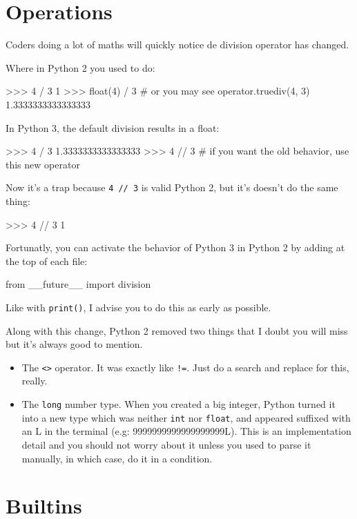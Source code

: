 \section{Operations}

Coders doing a lot of maths will quickly notice de division operator has changed.

Where in Python 2 you used to do:

\begin{py}
>>> 4 / 3
1
>>> float(4) / 3  # or you may see operator.truediv(4, 3)
1.3333333333333333
\end{py}

In Python 3, the default division results in a float:

\begin{py}
>>> 4 / 3
1.3333333333333333
>>> 4 // 3  # if you want the old behavior, use this new operator
\end{py}

Now it's a trap because \lstinline{4 // 3} is valid Python 2, but it's doesn't do the same thing:

\begin{py}
>>> 4 // 3
1
\end{py}

Fortunatly, you can activate the behavior of Python 3 in Python 2 by adding at the top of each file:

\begin{py}
from __future__ import division
\end{py}

Like with \lstinline{print()}, I advise you to do this as early as possible.

Along with this change, Python 2 removed two things that I doubt you will miss but it's always good to mention.

\begin{itemize}
    \item The \lstinline{<>} operator. It was exactly like \lstinline{!=}. Just do a search and replace for this, really.
    \item The \lstinline{long} number type. When you created a big integer, Python turned it into a new type which was neither \lstinline{int} nor \lstinline{float}, and appeared suffixed with an L in the terminal (e.g: 9999999999999999999L). This is an implementation detail and you should not worry about it unless you used to parse it manually, in which case, do it in a condition.
\end{itemize}

\section{Builtins}

